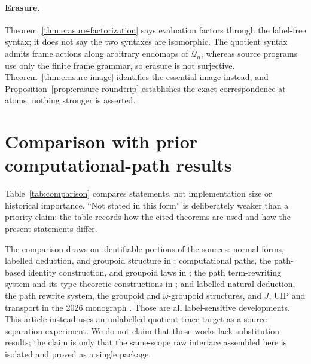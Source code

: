 \documentclass[10pt,reqno]{amsart}
\newcommand{\Q}{\mathcal{Q}}
\begin{document}
\paragraph{Erasure.}
Theorem~\ref{thm:erasure-factorization} says evaluation factors through the
label-free syntax; it does not say the two syntaxes are isomorphic.  The
quotient syntax admits frame actions along arbitrary endomaps of \(\Q_n\),
whereas source programs use only the finite frame grammar, so erasure is not
surjective.  Theorem~\ref{thm:erasure-image} identifies the essential image
instead, and Proposition~\ref{prop:erasure-roundtrip} establishes the exact
correspondence at atoms; nothing stronger is asserted.

\section{Comparison with prior computational-path results}
\label{sec:comparison}

Table~\ref{tab:comparison} compares statements, not implementation size or
historical importance.  ``Not stated in this form'' is deliberately weaker
than a priority claim: the table records how the cited theorems are used and
how the present statements differ.

The comparison draws on identifiable portions of the sources: normal forms,
labelled deduction, and groupoid structure in \cite{deQueirozEtAl2016};
computational paths, the path-based identity construction, and groupoid laws in
\cite{RamosEtAl2017}; the path term-rewriting system and its type-theoretic
constructions in \cite{RamosEtAl2018}; and labelled natural deduction, the path
rewrite system, the groupoid and \(\omega\)-groupoid structures, and \(J\),
UIP and transport in the 2026 monograph \cite{RamosEtAl2026}.  Those are all
label-sensitive developments.  This article instead uses an unlabelled
quotient-trace target as a source-separation experiment.  We do not claim that
those works lack substitution results; the claim is only that the same-scope
raw interface assembled here is isolated and proved as a single package.
\end{document}
